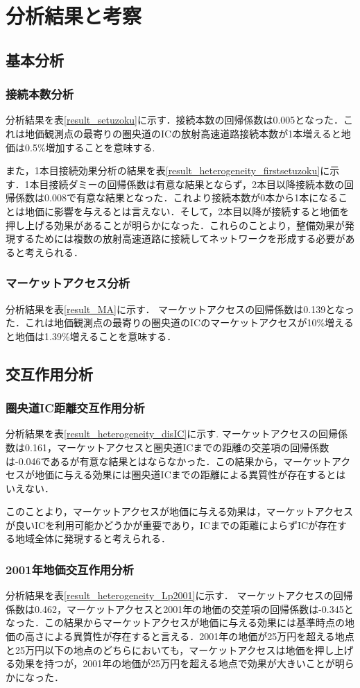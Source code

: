 \chapter{分析結果と考察}
\section{基本分析}
\subsection{接続本数分析}
分析結果を表\ref{result_setuzoku}に示す．接続本数の回帰係数は0.005となった．これは地価観測点の最寄りの圏央道のICの放射高速道路接続本数が1本増えると地価は0.5\%増加することを意味する.

また，1本目接続効果分析の結果を表\ref{result_heterogeneity_firstsetuzoku}に示す．1本目接続ダミーの回帰係数は有意な結果とならず，2本目以降接続本数の回帰係数は0.008で有意な結果となった．これより接続本数が0本から1本になることは地価に影響を与えるとは言えない．そして，2本目以降が接続すると地価を押し上げる効果があることが明らかになった．これらのことより，整備効果が発現するためには複数の放射高速道路に接続してネットワークを形成する必要があると考えられる．
\subsection{マーケットアクセス分析}
分析結果を表\ref{result_MA}に示す．
マーケットアクセスの回帰係数は0.139となった．これは地価観測点の最寄りの圏央道のICのマーケットアクセスが10\%増えると地価は1.39\%増えることを意味する．


\section{交互作用分析}


\subsection{圏央道IC距離交互作用分析}
分析結果を表\ref{result_heterogeneity_disIC}に示す.
マーケットアクセスの回帰係数は0.161，マーケットアクセスと圏央道ICまでの距離の交差項の回帰係数は-0.046であるが有意な結果とはならなかった．この結果から，マーケットアクセスが地価に与える効果には圏央道ICまでの距離による異質性が存在するとはいえない．

このことより，マーケットアクセスが地価に与える効果は，マーケットアクセスが良いICを利用可能かどうかが重要であり，ICまでの距離によらずICが存在する地域全体に発現すると考えられる．
\subsection{2001年地価交互作用分析}
分析結果を表\ref{result_heterogeneity_Lp2001}に示す．
マーケットアクセスの回帰係数は0.462，マーケットアクセスと2001年の地価の交差項の回帰係数は-0.345となった．この結果からマーケットアクセスが地価に与える効果には基準時点の地価の高さによる異質性が存在すると言える．2001年の地価が25万円を超える地点と25万円以下の地点のどちらにおいても，マーケットアクセスは地価を押し上げる効果を持つが，2001年の地価が25万円を超える地点で効果が大きいことが明らかになった．


